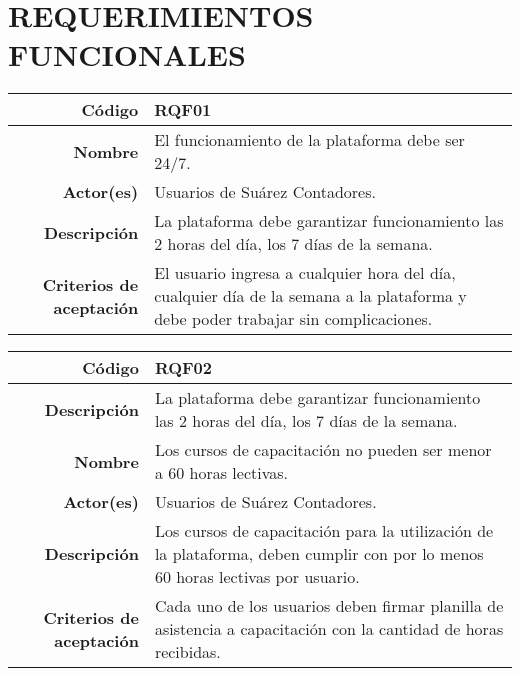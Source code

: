 \chapter{REQUERIMIENTOS FUNCIONALES}

%
\begin{table}[H]
	\centering
	\begin{tabular}{| r | p{10cm} |}
	\hline
	\textbf{C\'odigo} & \textbf{RQF01} \\
	\hline
	\textbf{Nombre} & El funcionamiento de la plataforma debe ser 24/7. \\
	\hline
	\textbf{Actor(es)} & Usuarios de Su\'arez Contadores. \\
	\hline
	\textbf{Descripci\'on} & La plataforma debe garantizar funcionamiento las 2 horas del d\'ia, los 7
		d\'ias de la semana.\\
	\hline
	\textbf{Criterios de aceptaci\'on} & 
		El usuario ingresa a cualquier hora del d\'ia, cualquier d\'ia de la semana a la plataforma
		y debe poder trabajar sin complicaciones.\\
	\hline
	\end{tabular}
\end{table}
%
\begin{table}[H]
	\centering
	\begin{tabular}{| r | p{10cm} |}
	\hline
	\textbf{C\'odigo} & \textbf{RQF02} \\
	\hline\hline
	\textbf{Descripci\'on} & La plataforma debe garantizar funcionamiento las 2 horas del d\'ia, los 7
		d\'ias de la semana.\\
	\textbf{Nombre} & Los cursos de capacitaci\'on no pueden ser menor a 60 horas lectivas.\\
	\hline
	\textbf{Actor(es)} & Usuarios de Su\'arez Contadores. \\
	\hline
	\textbf{Descripci\'on} & Los cursos de capacitaci\'on para la utilizaci\'on de la plataforma, deben
		cumplir con por lo menos 60 horas lectivas por usuario.\\	
	\hline
	\textbf{Criterios de aceptaci\'on} & 
		Cada uno de los usuarios deben firmar planilla de asistencia a capacitaci\'on con la cantidad
		de horas recibidas.\\
	\hline
	\end{tabular}
\end{table}
%